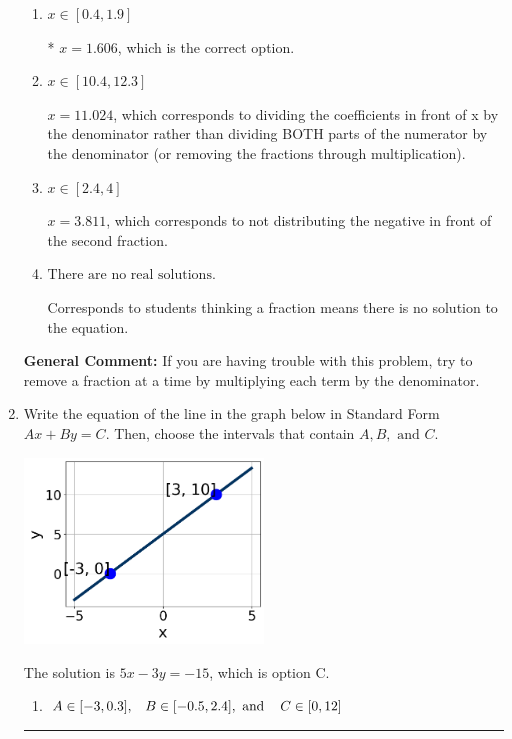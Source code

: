 \documentclass{extbook}[14pt]
\newcommand{\litem}[1]{\item #1

\rule{\textwidth}{0.4pt}}
\begin{document}
\begin{enumerate}
{\begin{enumerate}[label=\Alph*.]
 $x = 0.208$, which corresponds to dividing the second number in the numerator by the denominator rather than dividing BOTH parts of the numerator by the denominator (or removing the fractions through multiplication).
\item \( x \in [0.4, 1.9] \)

* $x = 1.606$, which is the correct option.
\item \( x \in [10.4, 12.3] \)

 $x = 11.024$, which corresponds to dividing the coefficients in front of x by the denominator rather than dividing BOTH parts of the numerator by the denominator (or removing the fractions through multiplication).
\item \( x \in [2.4, 4] \)

 $x = 3.811$, which corresponds to not distributing the negative in front of the second fraction.
\item \( \text{There are no real solutions.} \)

Corresponds to students thinking a fraction means there is no solution to the equation.
\end{enumerate}

\textbf{General Comment:} If you are having trouble with this problem, try to remove a fraction at a time by multiplying each term by the denominator.
}
\litem{
Write the equation of the line in the graph below in Standard Form $Ax+By=C$. Then, choose the intervals that contain $A, B, \text{ and } C$.

\begin{center}
    \includegraphics[width=0.5\textwidth]{../Figures/linearGraphToStandardCopyC.png}
\end{center}


The solution is \( 5x - 3y = -15 \), which is option C.\begin{enumerate}[label=\Alph*.]
\item \( A \in [-3, 0.3], \hspace{3mm} B \in [-0.5, 2.4], \text{ and } \hspace{3mm} C \in [0, 12] \)


\end{enumerate}}
\end{enumerate}
\end{document}
